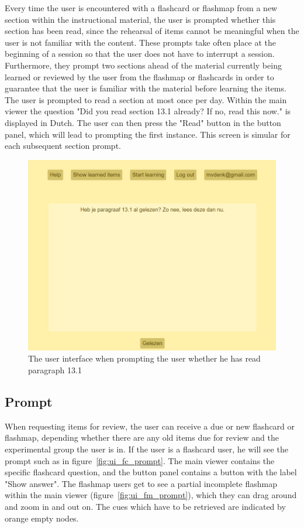 Every time the user is encountered with a flashcard or flashmap from a new section within the instructional material, the user is prompted whether this section has been read, since the rehearsal of items cannot be meaningful when the user is not familiar with the content. These prompts take often place at the beginning of a session so that the user does not have to interrupt a session. Furthermore, they prompt two sections ahead of the material currently being learned or reviewed by the user from the flashmap or flashcards in order to guarantee that the user is familiar with the material before learning the items. The user is prompted to read a section at most once per day. Within the main viewer the question "Did you read section 13.1 already? If no, read this now." is displayed in Dutch. The user can then press the "Read" button in the button panel, which will lead to prompting the first instance. This screen is simular for each subsequent section prompt.

\begin{figure}
    \centering
    \includegraphics[width=.8\textwidth]{img/ui_read_request.png}
    \caption{The user interface when prompting the user whether he has read paragraph 13.1}
    \label{fig:ui_read_request}
\end{figure}

\subsection{Prompt}

When requesting items for review, the user can receive a due or new flashcard or flashmap, depending whether there are any old items due for review and the experimental group the user is in. If the user is a flashcard user, he will see the prompt such as in figure~\ref{fig:ui_fc_prompt}. The main viewer contains the specific flashcard question, and the button panel contains a button with the label "Show answer". The flashmap users get to see a partial incomplete flashmap within the main viewer (figure~\ref{fig:ui_fm_prompt}), which they can drag around and zoom in and out on. The cues which have to be retrieved are indicated by orange empty nodes.

